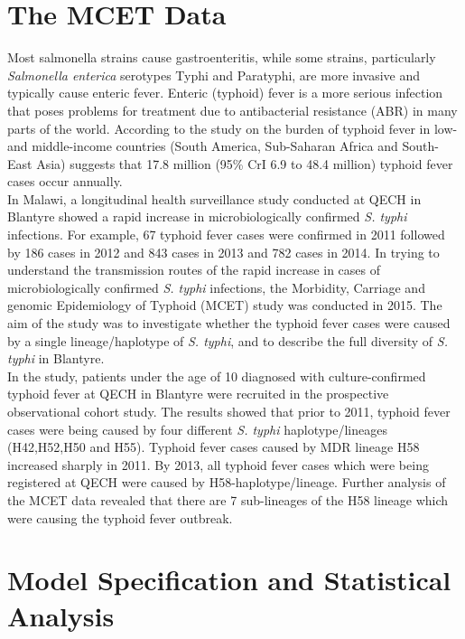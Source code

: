 \documentclass[12pt,a4paper]{report}
\begin{document}
\section{The MCET Data}

Most salmonella strains cause gastroenteritis, while some strains, particularly \textit{Salmonella enterica} serotypes Typhi and Paratyphi, are more invasive and typically cause enteric fever. Enteric (typhoid) fever is a more serious infection that poses problems for treatment due to antibacterial resistance (ABR) in many parts of the world. According to the study on the burden of typhoid fever in low-and middle-income countries (South America, Sub-Saharan Africa and South-East Asia) suggests that 17.8 million (95\% CrI 6.9 to 48.4 million) typhoid fever cases occur annually.\cite{Antillon}\\

In Malawi, a longitudinal health surveillance study conducted at QECH in Blantyre showed a rapid increase in microbiologically confirmed \textit{S. typhi} infections\cite{Feasey}. For example, 67 typhoid fever cases were confirmed in 2011 followed by 186 cases in 2012 and 843 cases in 2013 and 782 cases in 2014\cite{Feasey}. In trying to understand the transmission routes of the rapid increase in cases of microbiologically confirmed \textit{S. typhi} infections, the Morbidity, Carriage and genomic Epidemiology of Typhoid (MCET) study was conducted in 2015\cite{Feasey}. The aim of the study was to investigate whether the typhoid fever cases were caused by a single lineage/haplotype of \textit{S. typhi}, and to describe the full diversity of \textit{S. typhi} in Blantyre.\\

In the study, patients under the age of 10 diagnosed with culture-confirmed typhoid fever at QECH in Blantyre were recruited in the prospective observational cohort study.\cite{Feasey} The results showed that prior to 2011, typhoid fever cases were being caused by four different \textit{S. typhi} haplotype/lineages (H42,H52,H50 and H55). Typhoid fever cases caused by MDR lineage H58 increased sharply in 2011. By 2013, all typhoid fever cases which were being registered at QECH were caused by H58-haplotype/lineage.\cite{Feasey} Further analysis of the MCET data revealed that there are 7 sub-lineages of the H58 lineage which were causing the typhoid fever outbreak.\cite{Gauld2021}\\

\section{Model Specification and Statistical Analysis}
\end{document}
